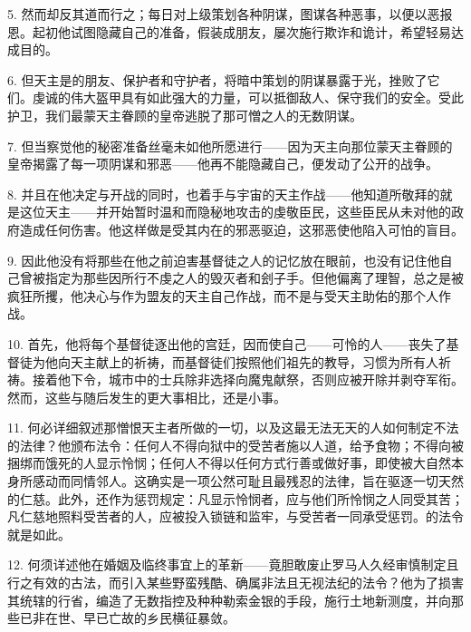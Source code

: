 5. 然而却反其道而行之；每日对上级策划各种阴谋，图谋各种恶事，以便以恶报恩。起初他试图隐藏自己的准备，假装成朋友，屡次施行欺诈和诡计，希望轻易达成目的。\par

6. 但天主是的朋友、保护者和守护者，将暗中策划的阴谋暴露于光，挫败了它们。虔诚的伟大盔甲具有如此强大的力量，可以抵御敌人、保守我们的安全。受此护卫，我们最蒙天主眷顾的皇帝逃脱了那可憎之人的无数阴谋。\par

7. 但当察觉他的秘密准备丝毫未如他所愿进行——因为天主向那位蒙天主眷顾的皇帝揭露了每一项阴谋和邪恶——他再不能隐藏自己，便发动了公开的战争。\par

8. 并且在他决定与开战的同时，也着手与宇宙的天主作战——他知道所敬拜的就是这位天主——并开始暂时温和而隐秘地攻击的虔敬臣民，这些臣民从未对他的政府造成任何伤害。他这样做是受其内在的邪恶驱迫，这邪恶使他陷入可怕的盲目。\par

9. 因此他没有将那些在他之前迫害基督徒之人的记忆放在眼前，也没有记住他自己曾被指定为那些因所行不虔之人的毁灭者和刽子手。但他偏离了理智，总之是被疯狂所攫，他决心与作为盟友的天主自己作战，而不是与受天主助佑的那个人作战。\par

10. 首先，他将每个基督徒逐出他的宫廷，因而使自己——可怜的人——丧失了基督徒为他向天主献上的祈祷，而基督徒们按照他们祖先的教导，习惯为所有人祈祷。接着他下令，城市中的士兵除非选择向魔鬼献祭，否则应被开除并剥夺军衔。然而，这些与随后发生的更大事相比，还是小事。\par

11. 何必详细叙述那憎恨天主者所做的一切，以及这最无法无天的人如何制定不法的法律？他颁布法令：任何人不得向狱中的受苦者施以人道，给予食物；不得向被捆绑而饿死的人显示怜悯；任何人不得以任何方式行善或做好事，即使被大自然本身所感动而同情邻人。这确实是一项公然可耻且最残忍的法律，旨在驱逐一切天然的仁慈。此外，还作为惩罚规定：凡显示怜悯者，应与他们所怜悯之人同受其苦；凡仁慈地照料受苦者的人，应被投入锁链和监牢，与受苦者一同承受惩罚。的法令就是如此。\par

12. 何须详述他在婚姻及临终事宜上的革新——竟胆敢废止罗马人久经审慎制定且行之有效的古法，而引入某些野蛮残酷、确属非法且无视法纪的法令？他为了损害其统辖的行省，编造了无数指控及种种勒索金银的手段，施行土地新测度，并向那些已非在世、早已亡故的乡民横征暴敛。\par


